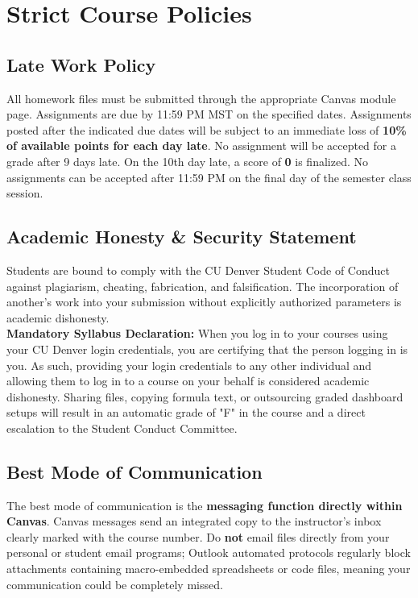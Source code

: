 \documentclass[11pt,a4paper]{article}
\begin{document}
\section*{Strict Course Policies}

\subsection*{Late Work Policy}
All homework files must be submitted through the appropriate Canvas module page. Assignments are due by 11:59 PM MST on the specified dates. Assignments posted after the indicated due dates will be subject to an immediate loss of \textbf{10\% of available points for each day late}. No assignment will be accepted for a grade after 9 days late. On the 10th day late, a score of \textbf{0} is finalized. No assignments can be accepted after 11:59 PM on the final day of the semester class session.

\subsection*{Academic Honesty \& Security Statement}
Students are bound to comply with the CU Denver Student Code of Conduct against plagiarism, cheating, fabrication, and falsification. The incorporation of another's work into your submission without explicitly authorized parameters is academic dishonesty.
\\
\textbf{Mandatory Syllabus Declaration:} When you log in to your courses using your CU Denver login credentials, you are certifying that the person logging in is you. As such, providing your login credentials to any other individual and allowing them to log in to a course on your behalf is considered academic dishonesty. Sharing files, copying formula text, or outsourcing graded dashboard setups will result in an automatic grade of "F" in the course and a direct escalation to the Student Conduct Committee.

\subsection*{Best Mode of Communication}
The best mode of communication is the \textbf{messaging function directly within Canvas}. Canvas messages send an integrated copy to the instructor's inbox clearly marked with the course number. Do \textbf{not} email files directly from your personal or student email programs; Outlook automated protocols regularly block attachments containing macro-embedded spreadsheets or code files, meaning your communication could be completely missed.
\end{document}
